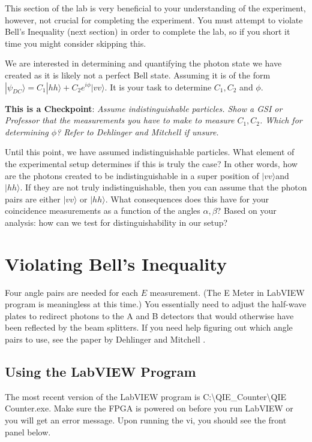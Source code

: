 \documentclass{../lab}
\begin{document}
This section of the lab is very beneficial to your understanding of the experiment, however, not crucial for completing the experiment. You must attempt to violate Bell's Inequality (next section) in order to complete the lab, so if you short it time you might consider skipping this.

We are interested in determining and quantifying the photon state we have created as it is likely not a perfect Bell state. Assuming it is of the form $|\psi_{DC}\rangle = C_1 |hh\rangle + C_2 e^{i\phi}|vv\rangle$. It is your task to determine $C_1, C_2$ and $\phi$.

\textbf{This is a Checkpoint}: \emph{Assume indistinguishable particles. Show a GSI or Professor that the measurements you have to make to measure $C_1, C_2$. Which for determining $\phi$? Refer to Dehlinger and Mitchell \cite{Dehlinger} if unsure.}

Until this point, we have assumed indistinguishable particles. What element of the experimental setup determines if this is truly the case? In other words, how are the photons created to be indistinguishable in a super position of $|vv\rangle$and $|hh\rangle$. If they are not truly indistinguishable, then you can assume that the photon pairs are either $|vv\rangle$ or $|hh\rangle$. What consequences does this have for your coincidence measurements as a function of the angles $\alpha, \beta$? Based on your analysis: how can we test for distinguishability in our setup?

\section{Violating Bell's Inequality}

Four angle pairs are needed for each $E$ measurement. (The E Meter in LabVIEW program is meaningless at this time.) You essentially need to adjust the half-wave plates to redirect photons to the A and B detectors that would otherwise have been reflected by the beam splitters. If you need help figuring out which angle pairs to use, see the paper by Dehlinger and Mitchell \cite{Dehlinger}.

\subsection{Using the LabVIEW Program}
\label{subsec:UsingLabVIEWProgram}

The most recent version of the LabVIEW program is C:\textbackslash QIE\_Counter\textbackslash QIE Counter.exe. Make sure the FPGA is powered on before you run LabVIEW or you will get an error message. Upon running the vi, you should see the front panel below.
\end{document}
